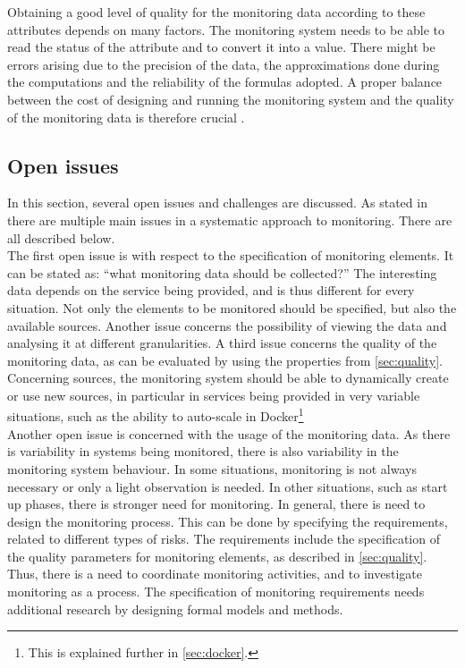 \noindent
Obtaining a good level of quality for the monitoring data according to these attributes depends on many factors. The monitoring system needs to be able to read the status of the attribute and to convert it into a value. There might be errors arising due to the precision of the data, the approximations done during the computations and the reliability of the formulas adopted. A proper balance between the cost of designing and running the monitoring system and the quality of the monitoring data is therefore crucial \cite{pernici2016monitoring}. 


\subsection{Open issues} \label{sec:open_issues}
In this section, several open issues and challenges are discussed. As stated in \cite{pernici2016monitoring, aceto2013cloud} there are multiple main issues in a systematic approach to monitoring. There are all described below.\\

\noindent
The first open issue is with respect to the specification of monitoring elements. It can be stated as: ``what monitoring data should be collected?'' The interesting data depends on the service being provided, and is thus different for every situation. Not only the elements to be monitored should be specified, but also the available sources. Another issue concerns the possibility of viewing the data and analysing it at different granularities. A third issue concerns the quality of the monitoring data, as can be evaluated by using the properties from \autoref{sec:quality}. Concerning sources, the monitoring system should be able to dynamically create or use new sources, in particular in services being provided in very variable situations, such as the ability to auto-scale in Docker\footnote{This is explained further in \autoref{sec:docker}.}\\

\noindent
Another open issue is concerned with the usage of the monitoring data. As there is variability in systems being monitored, there is also variability in the monitoring system behaviour. In some situations, monitoring is not always necessary or only a light observation is needed. In other situations, such as start up phases, there is stronger need for monitoring. In general, there is need to design the monitoring process. This can be done by specifying the requirements, related to different types of risks. The requirements include the specification of the quality parameters for monitoring elements, as described in \autoref{sec:quality}. Thus, there is a need to coordinate monitoring activities, and to investigate monitoring as a process. The specification of monitoring requirements needs additional research by designing formal models and methods.\\


